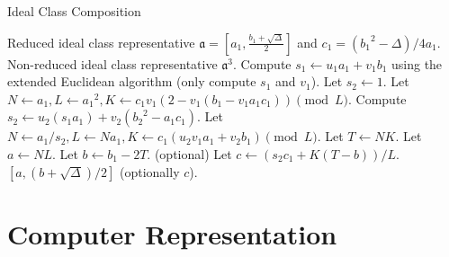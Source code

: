 \documentclass{ucalgthes1}
\theoremstyle{plain}
\theoremstyle{definition}
\newtheorem{defn}[thm]{Definition}
\newcommand{\OO}{\mathcal{O}}
\newcommand{\ZZ}{\mathbb{Z}}
\begin{document}
\begin{algorithm}[h!]
\caption{Ideal Class Composition}
\label{alg:idealCube}
\begin{algorithmic}[1]
\REQUIRE Reduced ideal class representative $\mathfrak a = \left[a_1, \frac{b_1 + \sqrt\Delta}{2}\right]$ and $c_1 = ({b_1}^2-\Delta)/4a_1$.
\ENSURE Non-reduced ideal class representative ${\mathfrak a}^3$.
\STATE Compute $s_1 \leftarrow u_1a_1 + v_1b_1$ using the extended Euclidean algorithm (only compute $s_1$ and $v_1$).
	\STATE Let $s_2 \leftarrow 1$.
	\STATE Let $N \leftarrow a_1, L \leftarrow {a_1}^2, K \leftarrow c_1v_1(2-v_1(b_1-v_1a_1c_1)) \pmod L$.
\ELSE
	\STATE Compute $s_2 \leftarrow u_2(s_1a_1) + v_2({b_2}^2-a_1c_1)$.
	\STATE Let $N \leftarrow a_1/s_2, L \leftarrow Na_1, K \leftarrow c_1(u_2v_1a_1+v_2b_1) \pmod L$.
\ENDIF
\STATE Let $T \leftarrow NK$.
\STATE Let $a \leftarrow NL$.
\STATE Let $b \leftarrow b_1 - 2T$.
\STATE (optional) Let $c \leftarrow (s_2c_1+K(T-b))/L$.
\RETURN $[a, (b+\sqrt\Delta)/2]$ (optionally $c$).
\end{algorithmic}
\end{algorithm}


\begin{comment}
\bigbreak
\section{To use still}



\begin{defn}
A \emph{prime ideal} of $\OO$ is an invertible $\OO$-ideal $\mathfrak{p} \neq \OO$ with the property that if $\mathfrak{p} | \mathfrak{a}\mathfrak{b}$, for $\OO$-ideals $\mathfrak{a}$ and $\mathfrak{b}$, then $\mathfrak{p} | \mathfrak{a}$ or $\mathfrak{p} | \mathfrak{b}$ \cite[p.~93]{JacobsonCh4}.
\end{defn}
In the ideal class group, the reduced form of a prime ideal $\mathfrak{p}$ is given by $[p, \beta]$ where $p \in \ZZ$ is prime.
\end{comment}


\bigbreak
\section{Computer Representation}
\label{section:computerRepresentation}
\end{document}
